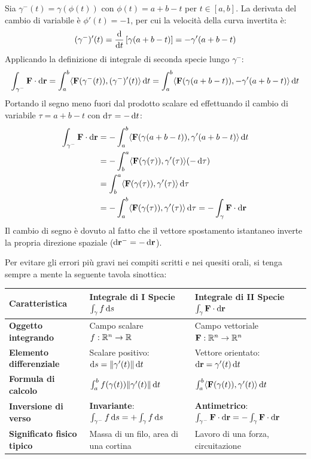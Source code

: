 \begin{dimostrazione}
Sia $\gamma^-(t) = \gamma(\phi(t))$ con $\phi(t) = a + b - t$ per $t \in [a,b]$.
La derivata del cambio di variabile è $\phi'(t) = -1$, per cui la velocità della curva invertita è:
\[
(\gamma^-)'(t) = \frac{\mathop{}\!\mathrm{d} }{\mathop{}\!\mathrm{d} t}\left[\gamma(a+b-t)\right] = -\gamma'(a+b-t)
\]
Applicando la definizione di integrale di seconda specie lungo $\gamma^-$:
\[
\int_{\gamma^-} \mathbf{F} \cdot \mathop{}\!\mathrm{d}\mathbf{r} = \int_{a}^{b} \langle\mathbf{F}(\gamma^-(t)), (\gamma^-)'(t)\rangle \mathop{}\!\mathrm{d} t = \int_{a}^{b} \langle\mathbf{F}(\gamma(a+b-t)), -\gamma'(a+b-t)\rangle \mathop{}\!\mathrm{d} t
\]
Portando il segno meno fuori dal prodotto scalare ed effettuando il cambio di variabile $\tau = a + b - t$ con $\mathop{}\!\mathrm{d}\tau = -\mathop{}\!\mathrm{d} t$:
\begin{align*}
\int_{\gamma^-} \mathbf{F} \cdot \mathop{}\!\mathrm{d}\mathbf{r} &= -\int_{a}^{b} \langle\mathbf{F}(\gamma(a+b-t)), \gamma'(a+b-t)\rangle \mathop{}\!\mathrm{d} t \\
&= -\int_{b}^{a} \langle\mathbf{F}(\gamma(\tau)), \gamma'(\tau)\rangle (-\mathop{}\!\mathrm{d}\tau) \\
&= \int_{b}^{a} \langle\mathbf{F}(\gamma(\tau)), \gamma'(\tau)\rangle \mathop{}\!\mathrm{d}\tau \\
&= -\int_{a}^{b} \langle\mathbf{F}(\gamma(\tau)), \gamma'(\tau)\rangle \mathop{}\!\mathrm{d}\tau = -\int_{\gamma} \mathbf{F} \cdot \mathop{}\!\mathrm{d}\mathbf{r}
\end{align*}
Il cambio di segno è dovuto al fatto che il vettore spostamento istantaneo inverte la propria direzione spaziale ($\mathop{}\!\mathrm{d}\mathbf{r}^- = -\mathop{}\!\mathrm{d}\mathbf{r}$).
\end{dimostrazione}

\begin{esame}
Per evitare gli errori più gravi nei compiti scritti e nei quesiti orali, si tenga sempre a mente la seguente tavola sinottica:
\begin{center}
\begin{tabularx}{\textwidth}{lXX}
\toprule
\textbf{Caratteristica} & \textbf{Integrale di I Specie $\int_\gamma f \mathop{}\!\mathrm{d} s$} & \textbf{Integrale di II Specie $\int_\gamma \mathbf{F} \cdot \mathop{}\!\mathrm{d}\mathbf{r}$} \\
\midrule
\textbf{Oggetto integrando} & Campo scalare $f: \mathbb{R}^n \to \mathbb{R}$ & Campo vettoriale $\mathbf{F}: \mathbb{R}^n \to \mathbb{R}^n$ \\
\textbf{Elemento differenziale} & Scalare positivo: $\mathop{}\!\mathrm{d} s = \lVert\gamma'(t)\rVert\mathop{}\!\mathrm{d} t$ & Vettore orientato: $\mathop{}\!\mathrm{d}\mathbf{r} = \gamma'(t)\mathop{}\!\mathrm{d} t$ \\
\textbf{Formula di calcolo} & $\int_a^b f(\gamma(t)) \lVert\gamma'(t)\rVert\mathop{}\!\mathrm{d} t$ & $\int_a^b \langle\mathbf{F}(\gamma(t)), \gamma'(t)\rangle\mathop{}\!\mathrm{d} t$ \\
\textbf{Inversione di verso} & \textbf{Invariante}: $\int_{\gamma^-} f\mathop{}\!\mathrm{d} s = +\int_\gamma f\mathop{}\!\mathrm{d} s$ & \textbf{Antimetrico}: $\int_{\gamma^-} \mathbf{F}\cdot\mathop{}\!\mathrm{d}\mathbf{r} = -\int_\gamma \mathbf{F}\cdot\mathop{}\!\mathrm{d}\mathbf{r}$ \\
\textbf{Significato fisico tipico} & Massa di un filo, area di una cortina & Lavoro di una forza, circuitazione \\
\bottomrule
\end{tabularx}
\end{center}
\end{esame}

